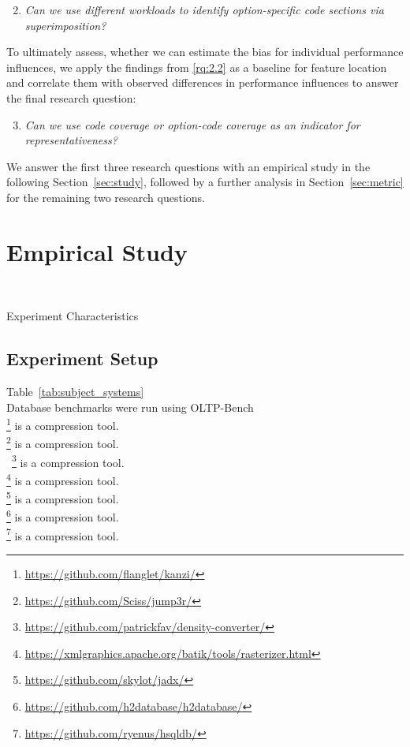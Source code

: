 \begin{enumerate}[align=left,label=RQ2.\arabic*]
	\setcounter{enumi}{1}
	\item\textit{Can we use different workloads to identify option-specific code sections via superimposition?}\label{rq:2.2}
\end{enumerate}

To ultimately assess, whether we can estimate the bias for individual performance influences, we apply the findings from \ref{rq:2.2} as a baseline for feature location and correlate them with observed differences in performance influences to answer the final research question:

\begin{enumerate}[align=left,label=RQ2.\arabic*]
	\setcounter{enumi}{2}
	\item\textit{Can we use code coverage or option-code coverage as an indicator for representativeness?}\label{rq:2.3}
\end{enumerate}

We answer the first three research questions with an empirical study in the following Section~\ref{sec:study}, followed by a further analysis in Section~\ref{sec:metric} for the remaining two research questions.

\clearpage
\section{Empirical Study}~\label{sec:study}
\begin{table*}[ht!]
	\centering
	\caption{Experiment Characteristics}
	
	\label{tab:subject_systems}
\end{table*}
\subsection{Experiment Setup}
Table~\ref{tab:subject_systems}\\
Database benchmarks were run using OLTP-Bench\cite{difallah_oltp_2013}\\
\noindent{}\footnote{\url{https://github.com/flanglet/kanzi/}} is a compression tool.\\
\footnote{\url{https://github.com/Sciss/jump3r/}} is a compression tool.\\\
\footnote{\url{https://github.com/patrickfav/density-converter/}} is a compression tool.\\
\sosy{batik}\footnote{\url{https://xmlgraphics.apache.org/batik/tools/rasterizer.html}} is a compression tool.\\
\sosy{jadx}\footnote{\url{https://github.com/skylot/jadx/}} is a compression tool.\\
\sosy{h2}\footnote{\url{https://github.com/h2database/h2database/}} is a compression tool.\\
\sosy{hsqldb}\footnote{\url{https://github.com/ryenus/hsqldb/}} is a compression tool.\\
